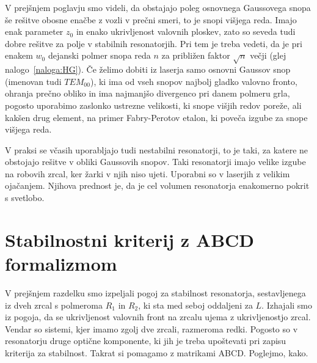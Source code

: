 V prejšnjem poglavju smo videli, da obstajajo poleg osnovnega Gaussovega
snopa še rešitve obosne enačbe z vozli v prečni smeri, to je snopi
višjega reda. Imajo enak parameter $z_{0}$ in enako ukrivljenost
valovnih ploskev, zato so seveda tudi dobre rešitve za polje v stabilnih
resonatorjih. Pri tem je treba vedeti, da je pri enakem $w_{0}$
dejanski polmer snopa reda $n$ za približen faktor $\sqrt{n}$ večji 
(glej nalogo~\ref{naloga:HG}). Če želimo dobiti iz laserja samo 
osnovni Gaussov snop (imenovan tudi $TEM_{00}$), ki ima od vseh snopov
najbolj gladko valovno fronto, ohranja prečno obliko in ima najmanjšo 
divergenco pri danem polmeru grla, pogosto uporabimo zaslonko
ustrezne velikosti, ki snope višjih redov poreže, ali kakšen drug
element, na primer Fabry-Perotov etalon, ki poveča izgube za snope višjega reda.
 
\begin{remark}
V praksi se včasih uporabljajo tudi nestabilni resonatorji, to je
taki, za katere ne obstojajo rešitve v obliki Gaussovih snopov. Taki
resonatorji imajo velike izgube na robovih zrcal, ker žarki v njih niso ujeti. 
Uporabni so v laserjih z velikim ojačanjem. Njihova prednost je, da je cel
volumen resonatorja enakomerno pokrit s svetlobo.
\end{remark}

\section{Stabilnostni kriterij z ABCD formalizmom}
V prejšnjem razdelku smo izpeljali pogoj za stabilnost resonatorja, 
sestavljenega iz dveh zrcal s polmeroma $R_1$ in $R_2$, ki sta med 
seboj oddaljeni za $L$. Izhajali smo iz pogoja, da se ukrivljenost
valovnih front na zrcalu ujema z ukrivljenostjo zrcal. Vendar so sistemi,
kjer imamo zgolj dve zrcali, razmeroma redki. Pogosto so v resonatorju
druge optične komponente, ki jih je treba upoštevati pri zapisu
kriterija za stabilnost. Takrat si pomagamo z matrikami ABCD. Poglejmo, kako.


